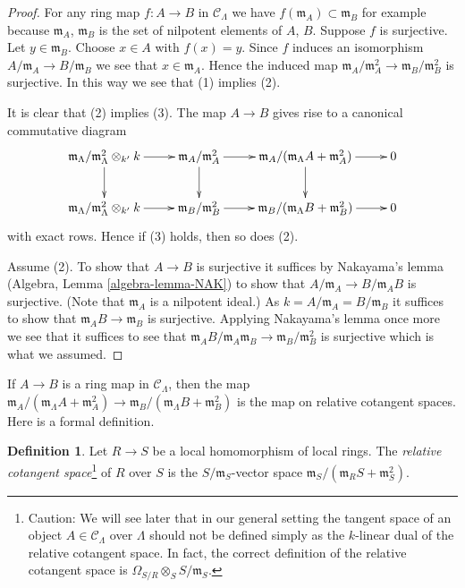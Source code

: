 \documentclass{stacks-project}
\theoremstyle{plain}
\theoremstyle{definition}
\newtheorem{definition}[subsection]{Definition}
\theoremstyle{remark}
\numberwithin{equation}{subsection}
\begin{document}
\begin{proof}
For any ring map $f : A \to B$ in $\mathcal{C}_\Lambda$ we have
$f(\mathfrak m_A) \subset \mathfrak m_B$ for example because
$\mathfrak m_A$, $\mathfrak m_B$ is the set of nilpotent elements of
$A$, $B$. Suppose $f$ is surjective. Let $y \in \mathfrak m_B$.
Choose $x \in A$ with $f(x) = y$. Since $f$ induces an isomorphism
$A/\mathfrak m_A \to B/\mathfrak m_B$ we see that $x \in \mathfrak m_A$.
Hence the induced map
$\mathfrak m_A/\mathfrak m_A^2 \to \mathfrak m_B/\mathfrak m_B^2$
is surjective. In this way we see that (1) implies (2).

\medskip\noindent
It is clear that (2) implies (3). The map $A \to B$ gives rise
to a canonical commutative diagram
$$
\xymatrix{
\mathfrak m_\Lambda/\mathfrak m_\Lambda^2 \otimes_{k'} k \ar[r] \ar[d] &
\mathfrak m_A/\mathfrak m_A^2 \ar[r] \ar[d] &
\mathfrak m_A/(\mathfrak m_\Lambda A + \mathfrak m_A^2) \ar[r] \ar[d] & 0 \\
\mathfrak m_\Lambda/\mathfrak m_\Lambda^2 \otimes_{k'} k \ar[r] &
\mathfrak m_B/\mathfrak m_B^2 \ar[r] &
\mathfrak m_B/(\mathfrak m_\Lambda B + \mathfrak m_B^2) \ar[r] & 0
}
$$
with exact rows. Hence if (3) holds, then so does (2).

\medskip\noindent
Assume (2). To show that $A \to B$ is surjective it suffices by
Nakayama's lemma (Algebra, Lemma \ref{algebra-lemma-NAK})
to show that $A/\mathfrak m_A \to B/\mathfrak m_AB$ is surjective.
(Note that $\mathfrak m_A$ is a nilpotent ideal.)
As $k = A/\mathfrak m_A = B/\mathfrak m_B$ it suffices to show that
$\mathfrak m_AB \to \mathfrak m_B$ is surjective. Applying
Nakayama's lemma once more we see that it suffices to see that
$\mathfrak m_AB/\mathfrak m_A\mathfrak m_B \to \mathfrak m_B/\mathfrak m_B^2$
is surjective which is what we assumed.
\end{proof}

\noindent
If $A \to B$ is a ring map in $\mathcal{C}_\Lambda$, then the map
$\mathfrak m_A/(\mathfrak m_\Lambda A + \mathfrak m_A^2)
\to \mathfrak m_B/(\mathfrak m_\Lambda B + \mathfrak m_B^2)$
is the map on relative cotangent spaces. Here is a formal definition.

\begin{definition}
\label{definition-tangent-space-ring}
Let $R \to S$ be a local homomorphism of local rings. The
{\it relative cotangent space}\footnote{Caution: We will see later
that in our general setting the tangent
space of an object $A \in \mathcal{C}_\Lambda$ over $\Lambda$ should
not be defined simply as the $k$-linear dual of the relative
cotangent space. In fact, the correct definition of the relative
cotangent space is
$\Omega_{S/R} \otimes_S S/\mathfrak m_S$.} of $R$ over $S$ is the
$S/\mathfrak m_S$-vector space
$\mathfrak m_S/(\mathfrak m_R S + \mathfrak m_S^2)$.
\end{definition}
\end{document}
